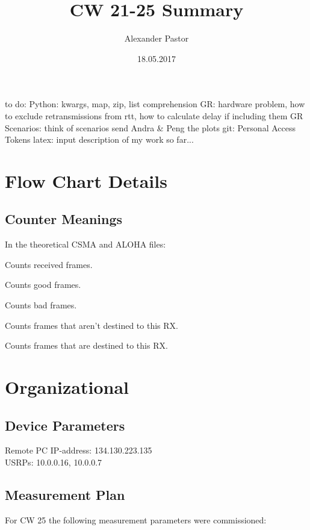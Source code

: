 \documentclass{article}
\begin{document}
	
\title{CW 21-25 Summary}
\author{Alexander Pastor}
\date{18.05.2017}
\maketitle
\tableofcontents
\newpage

to do:
Python: kwargs, map, zip, list comprehension
GR: hardware problem, how to exclude retransmissions from rtt, how to calculate delay if including them
GR Scenarios: think of scenarios
send Andra \& Peng the plots
git: Personal Access Tokens
latex: input
description of my work so far...

\section{Flow Chart Details}
\subsection{Counter Meanings}

In the theoretical CSMA and ALOHA files:
\begin{description}[leftmargin=!]
	\item[Counter 1:] Counts received frames.
	\item[Counter 2:] Counts good frames.
	\item[Counter 3:] Counts bad frames.
	\item[Counter 4:] Counts frames that aren't destined to this RX.
	\item[Counter 5:] Counts frames that are destined to this RX.
\end{description}

\section{Organizational}

\subsection{Device Parameters}

Remote PC IP-address: 134.130.223.135 \\
USRPs: 10.0.0.16, 10.0.0.7

\subsection{Measurement Plan}

For CW 25 the following measurement parameters were commissioned:
\end{document}
